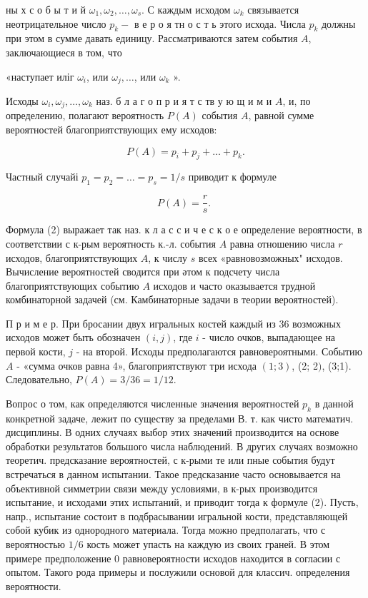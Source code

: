 \documentclass[10pt]{article}
\begin{document}
ны х с о б ы т и й $\omega_{1}, \omega_{2}, \ldots, \omega_{s}$. С каждым исходом $\omega_{k}$ связывается неотрицательное число $p_{k}-$ в е р о я тн о с т ь этого исхода. Числа $p_{k}$ должны при этом в сумме давать единицу. Рассматриваются затем события $A$, заключающиеся в том, что



«наступает иліг $\omega_{i}$, или $\omega_{j}, \ldots$, или $\omega_{k}$ ».



Исходы $\omega_{i}, \omega_{j}, \ldots, \omega_{k}$ наз. б л а г о п р и я т с тв у ю щ и м и $A$, и, по определению, полагают вероятность $P(A)$ события $A$, равной сумме вероятностей благоприятствующих ему исходов:



\[

P(A)=p_{i}+p_{j}+\ldots+p_{k} .

\]



Частный случайі $p_{1}=p_{2}=\ldots=p_{s}=1 / s$ приводит к формуле



\[

P(A)=\frac{r}{s} \text {. }

\]



Формула (2) выражает так наз. к л а с с и ч е с к о е определение вероятности, в соответствии с к-рым вероятность к.-л. события $A$ равна отношению числа $r$ исходов, благоприятствующих $A$, к числу $s$ всех «равновозможных" исходов. Вычисление вероятностей сводится при әтом к подсчету числа благоприятствующих событию $A$ исходов и часто оказывается трудной комбинаторной задачей (см. Камбинаторные задачи в теории вероятностей).



П р и м е р. При бросании двух игральных костей каждый из 36 возможных исходов может быть обозначен $(i, j)$, где $i$ - число очков, выпадающее на первой кости, $j$ - на второй. Исходы предполагаются равновероятными. Событию $A$ - «сумма очков равна 4», благоприятствуют три исхода $(1 ; 3)$, (2; 2$)$, (3;1). Следовательно, $P(A)=3 / 36=1 / 12$.



Вопрос о том, как определяются численные значения вероятностей $p_{k}$ в данной конкретной задаче, лежит по существу за пределами В. т. как чисто математич. дисциплины. В одних случаях выбор этих значений производится на основе обработки результатов большого числа наблюдений. В других случаях возможно теоретич. предсказание вероятностей, с к-рыми те или пные события будут встречаться в данном испытании. Такое предсказание часто основывается на объективной симметрии связи между условиями, в к-рых производится испытание, и исходами этих испытаний, и приводит тогда к формуле (2). Пусть, напр., испытание состоит в подбрасывании игральной кости, представляющей собой кубик из однородного материала. Тогда можно предполагать, что с вероятностью $1 / 6$ кость может упасть на каждую из своих граней. В этом примере предположение 0 равновероятности исходов находится в согласии с опытом. Такого рода примеры и послужили основой для классич. определения вероятности.
\end{document}
